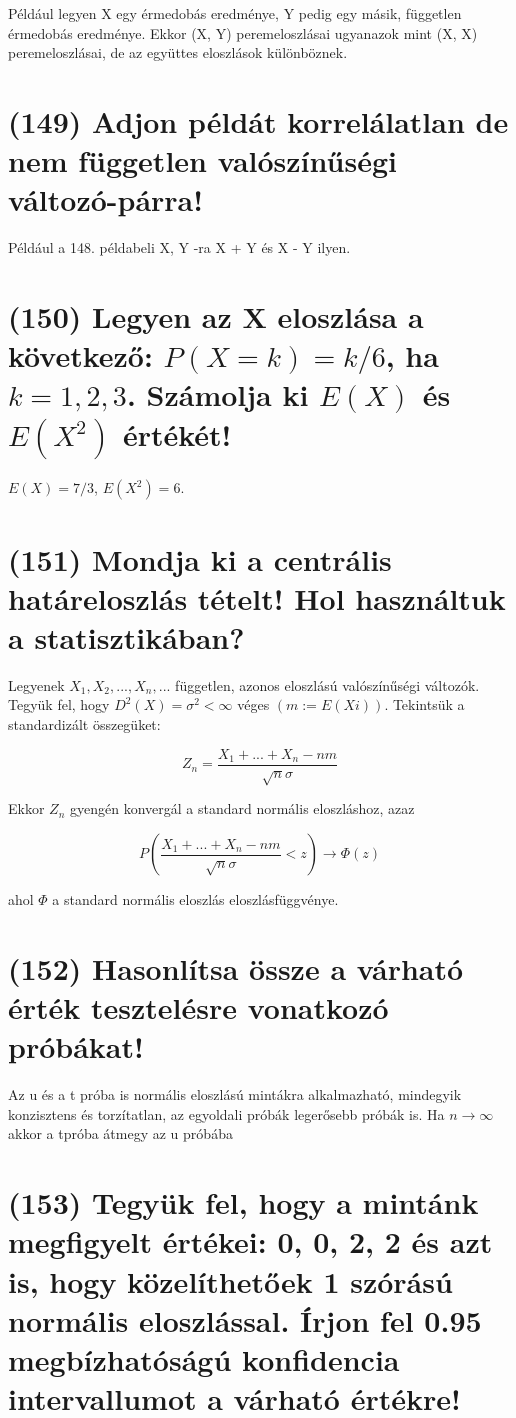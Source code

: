 \documentclass[12p]{article}
\begin{document}
Például legyen X egy érmedobás eredménye, Y pedig egy másik, független érmedobás eredménye. Ekkor (X, Y) peremeloszlásai ugyanazok mint (X, X) peremeloszlásai, de az együttes eloszlások különböznek.

\section{(149) Adjon példát korrelálatlan de nem független valószínűségi változó-párra!}

Például a 148. példabeli X, Y -ra X + Y és X - Y ilyen.

\section{(150) Legyen az X eloszlása a következő: $P(X = k) = k/6$, ha $k = 1, 2, 3$. Számolja ki $E(X)$ és $E(X^2)$ értékét!}

$E(X) = 7/3$, $E(X^2) = 6$.

\section{(151) Mondja ki a centrális határeloszlás tételt! Hol használtuk a statisztikában?}

Legyenek $X_1 , X_2 ,..., X_n ,...$ független, azonos eloszlású valószínűségi változók. Tegyük fel, hogy $D^2(X) = \sigma^2 < \infty$ véges $(m:=E(Xi))$. Tekintsük a standardizált összegüket:

$$Z_n = \frac{X_1 + ... + X_n -nm}{\sqrt{n}\sigma}$$

Ekkor $Z_n$ gyengén konvergál a standard normális eloszláshoz,
azaz

$$P(\frac{X_1 + ... + X_n - nm}{\sqrt{n}\sigma} < z) \rightarrow \Phi(z)$$

ahol $\Phi$ a standard normális eloszlás eloszlásfüggvénye.

\section{(152) Hasonlítsa össze a várható érték tesztelésre vonatkozó próbákat!}

Az u és a t próba is normális eloszlású mintákra alkalmazható, mindegyik konzisztens és torzítatlan, az egyoldali próbák legerősebb próbák is. Ha $n \rightarrow \infty$ akkor a tpróba átmegy az u próbába

\section{(153) Tegyük fel, hogy a mintánk megfigyelt értékei: 0, 0, 2, 2 és azt is, hogy közelíthetőek 1 szórású normális eloszlással. Írjon fel 0.95 megbízhatóságú konfidencia intervallumot a várható értékre!}
\end{document}
